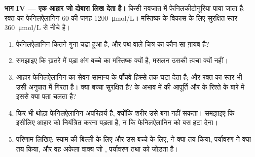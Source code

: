 \begin{problem}
\medskip
\noindent\textbf{भाग IV --- एक आहार जो  दोबारा लिख देता है।}
किसी नवजात में फेनिलकीटोनूरिया पाया जाता है: रक्त का फेनिलऐलानिन \num{60}
की जगह \qty{1200}{\micro mol/L}। मस्तिष्क के विकास के लिए सुरक्षित स्तर
\qty{360}{\micro mol/L} से नीचे है।
\begin{enumerate}[resume]
  \item फेनिलऐलानिन कितने गुना चढ़ा हुआ है, और पथ वाले चित्र का कौन-सा
         ग़ायब है?
  \item समझाइए कि ख़तरे में पड़ा अंग बच्चे का मस्तिष्क क्यों है, मसलन उसकी
        त्वचा क्यों नहीं।
  \item आहार फेनिलऐलानिन का सेवन सामान्य के पाँचवें हिस्से तक घटा देता है;
        और रक्त का स्तर भी उसी अनुपात में गिरता है। क्या बच्चा सुरक्षित
        है?  के अभाव में  की आपूर्ति और  के
        रिश्ते के बारे में इससे क्या पता चलता है?
  \item फिर भी थोड़ा फेनिलऐलानिन अपरिहार्य है, क्योंकि शरीर उसे बना नहीं
        सकता। समझाइए कि इसीलिए आहार को नियंत्रित करना पड़ता है, न कि
        फेनिलऐलानिन को बस हटा देना।
  \item परिणाम लिखिए: स्याम की बिल्ली के लिए और उस बच्चे के लिए,
         ने क्या तय किया, पर्यावरण ने क्या तय किया, और वह अकेला
        वाक्य जो , पर्यावरण तथा  को जोड़ता है।
\end{enumerate}
\end{problem}
